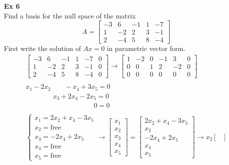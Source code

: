 \documentclass{article}
\begin{document}
  \textbf{Ex 6}\\
  Find a basis for the null space of the matrix
  \[
    A = \begin{bmatrix}
      -3 &6 &-1 &1 &-7\\
      1 &-2 &2 &3 &-1\\
      2 &-4 &5 &8 &-4
    \end{bmatrix}
  \]
  First write the solution of $ Ax=0 $ in parametric vector form.
  \[
    \begin{gathered}
    \begin{bmatrix}
      -3 &6 &-1 &1 &-7 &0\\
      1 &-2 &2 &3 &-1 &0\\
      2 &-4 &5 &8 &-4 &0
    \end{bmatrix} \to
    \begin{bmatrix}
      1 &-2 &0 &-1 &3 &0\\
      0 &0 &1 &2 &-2 &0\\
      0 &0 &0 &0 &0 &0
    \end{bmatrix}\\
    ~\\
    x_1-2x_2 \qquad -x_4 +3x_5=0\\
    \qquad \qquad x_3 + 2x_4 -2x_5=0\\
    \qquad \qquad \qquad \qquad \qquad 0=0\\
    ~\\
    \begin{cases}
      x_1=2x_2+x_4-3x_5\\
      x_2=\text{free}\\
      x_3=-2x_4+2x_5\\
      x_4=\text{free}\\
      x_5=\text{free}
    \end{cases} \to 
    \begin{bmatrix}
      x_1\\
      x_2\\
      x_3\\
      x_4\\
      x_5
    \end{bmatrix} = 
    \begin{bmatrix}
      2x_2+x_4-3x_5\\
      x_2\\
      -2x_4+2x_5\\
      x_4\\
      x_5
    \end{bmatrix} \to
    x_2\begin{bmatrix}

\end{bmatrix}
\end{gathered}\]
\end{document}
